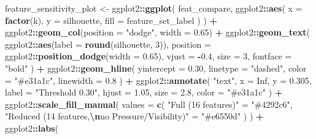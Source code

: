 \documentclass[
]{article}
\newenvironment{Shaded}{\begin{snugshade}}{\end{snugshade}}
\newcommand{\AttributeTok}[1]{\textcolor[rgb]{0.13,0.29,0.53}{#1}}
\newcommand{\ConstantTok}[1]{\textcolor[rgb]{0.56,0.35,0.01}{#1}}
\newcommand{\DecValTok}[1]{\textcolor[rgb]{0.00,0.00,0.81}{#1}}
\newcommand{\FloatTok}[1]{\textcolor[rgb]{0.00,0.00,0.81}{#1}}
\newcommand{\FunctionTok}[1]{\textcolor[rgb]{0.13,0.29,0.53}{\textbf{#1}}}
\newcommand{\NormalTok}[1]{#1}
\newcommand{\OtherTok}[1]{\textcolor[rgb]{0.56,0.35,0.01}{#1}}
\newcommand{\SpecialCharTok}[1]{\textcolor[rgb]{0.81,0.36,0.00}{\textbf{#1}}}
\newcommand{\StringTok}[1]{\textcolor[rgb]{0.31,0.60,0.02}{#1}}
\begin{document}
\begin{Shaded}
\begin{Highlighting}[]
\NormalTok{  feature\_sensitivity\_plot }\OtherTok{\textless{}{-}}\NormalTok{ ggplot2}\SpecialCharTok{::}\FunctionTok{ggplot}\NormalTok{(}
\NormalTok{    feat\_compare,}
\NormalTok{    ggplot2}\SpecialCharTok{::}\FunctionTok{aes}\NormalTok{(}
      \AttributeTok{x    =} \FunctionTok{factor}\NormalTok{(k),}
      \AttributeTok{y    =}\NormalTok{ silhouette,}
      \AttributeTok{fill =}\NormalTok{ feature\_set\_label}
\NormalTok{    )}
\NormalTok{  ) }\SpecialCharTok{+}
\NormalTok{    ggplot2}\SpecialCharTok{::}\FunctionTok{geom\_col}\NormalTok{(}\AttributeTok{position =} \StringTok{"dodge"}\NormalTok{, }\AttributeTok{width =} \FloatTok{0.65}\NormalTok{) }\SpecialCharTok{+}
\NormalTok{    ggplot2}\SpecialCharTok{::}\FunctionTok{geom\_text}\NormalTok{(}
\NormalTok{      ggplot2}\SpecialCharTok{::}\FunctionTok{aes}\NormalTok{(}\AttributeTok{label =} \FunctionTok{round}\NormalTok{(silhouette, }\DecValTok{3}\NormalTok{)),}
      \AttributeTok{position =}\NormalTok{ ggplot2}\SpecialCharTok{::}\FunctionTok{position\_dodge}\NormalTok{(}\AttributeTok{width =} \FloatTok{0.65}\NormalTok{),}
      \AttributeTok{vjust =} \SpecialCharTok{{-}}\FloatTok{0.4}\NormalTok{, }\AttributeTok{size =} \DecValTok{3}\NormalTok{, }\AttributeTok{fontface =} \StringTok{"bold"}
\NormalTok{    ) }\SpecialCharTok{+}
\NormalTok{    ggplot2}\SpecialCharTok{::}\FunctionTok{geom\_hline}\NormalTok{(}
      \AttributeTok{yintercept =} \FloatTok{0.30}\NormalTok{, }\AttributeTok{linetype =} \StringTok{"dashed"}\NormalTok{,}
      \AttributeTok{color =} \StringTok{"\#e31a1c"}\NormalTok{, }\AttributeTok{linewidth =} \FloatTok{0.8}
\NormalTok{    ) }\SpecialCharTok{+}
\NormalTok{    ggplot2}\SpecialCharTok{::}\FunctionTok{annotate}\NormalTok{(}
      \StringTok{"text"}\NormalTok{, }\AttributeTok{x =} \ConstantTok{Inf}\NormalTok{, }\AttributeTok{y =} \FloatTok{0.305}\NormalTok{,}
      \AttributeTok{label =} \StringTok{"Threshold 0.30"}\NormalTok{,}
      \AttributeTok{hjust =} \FloatTok{1.05}\NormalTok{, }\AttributeTok{size =} \FloatTok{2.8}\NormalTok{, }\AttributeTok{color =} \StringTok{"\#e31a1c"}
\NormalTok{    ) }\SpecialCharTok{+}
\NormalTok{    ggplot2}\SpecialCharTok{::}\FunctionTok{scale\_fill\_manual}\NormalTok{(}
      \AttributeTok{values =} \FunctionTok{c}\NormalTok{(}
        \StringTok{"Full (16 features)"}                        \OtherTok{=} \StringTok{"\#4292c6"}\NormalTok{,}
        \StringTok{"Reduced (14 features,}\SpecialCharTok{\textbackslash{}n}\StringTok{no Pressure/Visibility)"} \OtherTok{=} \StringTok{"\#e6550d"}
\NormalTok{      )}
\NormalTok{    ) }\SpecialCharTok{+}
\NormalTok{    ggplot2}\SpecialCharTok{::}\FunctionTok{labs}\NormalTok{(}

\end{Highlighting}
\end{Shaded}
\end{document}
